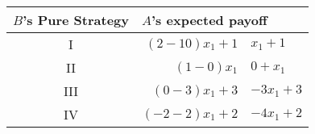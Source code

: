 \begin{table}[!ht]
\centering
\begin{tabular}{cr@{ = }l}
\toprule
\textbf{$B$'s Pure Strategy} & \multicolumn{2}{l}{\textbf{$A$'s expected payoff}}\\ \midrule
I    & $(2-10)x_1 +1$   &$x_1+1$\\
II   & $(1-0)x_1$       & $0 + x_1$\\
III  & $(0-3) x_1 + 3$  & $-3x_1 + 3$\\
IV   & $(-2-2) x_1 + 2$ & $- 4 x_1 + 2$\\ \bottomrule
\end{tabular}
\end{table}